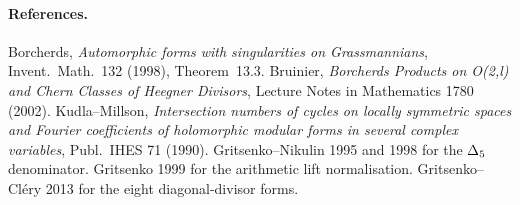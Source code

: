 \paragraph{References.}
Borcherds, \emph{Automorphic forms with singularities on
Grassmannians}, Invent.\ Math.\ 132 (1998), Theorem~13.3.  Bruinier,
\emph{Borcherds Products on O(2,l) and Chern Classes of Heegner
Divisors}, Lecture Notes in Mathematics 1780 (2002).  Kudla--Millson,
\emph{Intersection numbers of cycles on locally symmetric spaces and
Fourier coefficients of holomorphic modular forms in several complex
variables}, Publ.\ IHES 71 (1990).  Gritsenko--Nikulin 1995 and 1998
for the \(\Delta_5\) denominator.  Gritsenko 1999 for the arithmetic
lift normalisation.  Gritsenko--Cl\'ery 2013 for the eight
diagonal-divisor forms.
